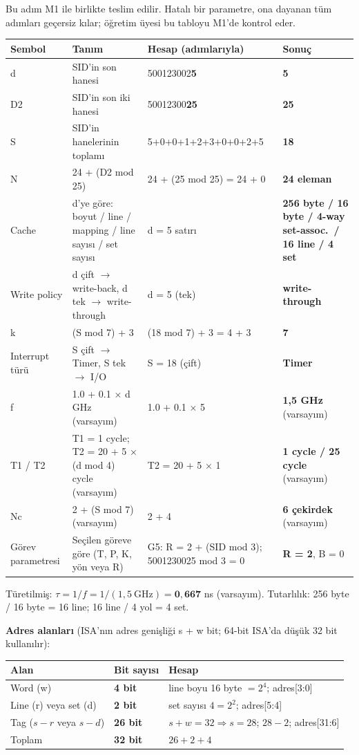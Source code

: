 \documentclass[11pt,a4paper]{article}
\newcommand{\hd}[1]{\cellcolor{hdr}#1}
\begin{document}
Bu adım M1 ile birlikte teslim edilir. Hatalı bir parametre, ona dayanan tüm adımları geçersiz
kılar; öğretim üyesi bu tabloyu M1'de kontrol eder.

\begin{longtable}{|p{2.0cm}|p{4.5cm}|p{4.9cm}|p{3.1cm}|}
\hline
\hd{Sembol} & \hd{Tanım} & \hd{Hesap (adımlarıyla)} & \hd{Sonuç}\\
\hline
\endhead
d & SID'in son hanesi & 500123002\textbf{5} & \textbf{5}\\
\hline
D2 & SID'in son iki hanesi & 50012300\textbf{25} & \textbf{25}\\
\hline
S & SID'in hanelerinin toplamı & 5+0+0+1+2+3+0+0+2+5 & \textbf{18}\\
\hline
N & 24 + (D2 mod 25) & 24 + (25 mod 25) = 24 + 0 & \textbf{24 eleman}\\
\hline
Cache & d'ye göre: boyut / line / mapping / line sayısı / set sayısı & d = 5 satırı & \textbf{256 byte / 16 byte / 4-way set-assoc.\ / 16 line / 4 set}\\
\hline
Write policy & d çift $\rightarrow$ write-back, d tek $\rightarrow$ write-through & d = 5 (tek) & \textbf{write-through}\\
\hline
k & (S mod 7) + 3 & (18 mod 7) + 3 = 4 + 3 & \textbf{7}\\
\hline
Interrupt türü & S çift $\rightarrow$ Timer, S tek $\rightarrow$ I/O & S = 18 (çift) & \textbf{Timer}\\
\hline
f & 1.0 + 0.1 × d GHz (varsayım) & 1.0 + 0.1 × 5 & \textbf{1,5 GHz} (varsayım)\\
\hline
T1 / T2 & T1 = 1 cycle; T2 = 20 + 5 × (d mod 4) cycle (varsayım) & T2 = 20 + 5 × 1 & \textbf{1 cycle / 25 cycle} (varsayım)\\
\hline
Nc & 2 + (S mod 7) (varsayım) & 2 + 4 & \textbf{6 çekirdek} (varsayım)\\
\hline
Görev parametresi & Seçilen göreve göre (T, P, K, yön veya R) & G5: R = 2 + (SID mod 3); 5001230025 mod 3 = 0 & \textbf{R = 2}, B = 0\\
\hline
\end{longtable}

Türetilmiş: $\tau = 1/f = 1/(1{,}5\ \text{GHz}) = \mathbf{0{,}667}$ ns (varsayım).
Tutarlılık: 256 byte / 16 byte = 16 line; 16 line / 4 yol = 4 set.

\textbf{Adres alanları} (ISA'nın adres genişliği s + w bit; 64-bit ISA'da düşük 32 bit kullanılır):

\begin{longtable}{|p{6.0cm}|p{2.8cm}|p{6.2cm}|}
\hline
\hd{Alan} & \hd{Bit sayısı} & \hd{Hesap}\\
\hline
Word (w) & \textbf{4 bit} & line boyu 16 byte $= 2^4$; adres[3:0]\\
\hline
Line (r) veya set (d) & \textbf{2 bit} & set sayısı $4 = 2^2$; adres[5:4]\\
\hline
Tag ($s - r$ veya $s - d$) & \textbf{26 bit} & $s + w = 32 \Rightarrow s = 28$; $28 - 2$; adres[31:6]\\
\hline
Toplam & \textbf{32 bit} & $26 + 2 + 4$\\
\hline
\end{longtable}
\end{document}
